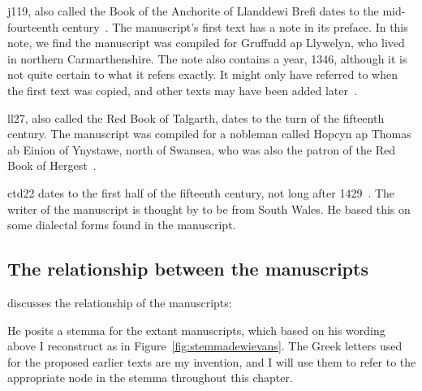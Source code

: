 \Acrlong{j119}, also called the Book of the Anchorite of Llanddewi Brefi dates to the mid-fourteenth century~\autocite{Tho_TEI13}. The manuscript's first text has a note in its preface. In this note, we find the manuscript was compiled for Gruffudd ap Llywelyn, who lived in northern Carmarthenshire. The note also contains a year, 1346, although it is not quite certain to what it refers exactly. It might only have referred to when the first text was copied, and other texts may have been added later~\autocite[lvi--lvii]{Eva_Welsh88}.

\Acrlong{ll27}, also called the Red Book of Talgarth, dates to the turn of the fifteenth century. The manuscript was compiled for a nobleman called Hopcyn ap Thomas ab Einion of Ynystawe, north of Swansea, who was also the patron of the Red Book of Hergest~\autocite[lvii]{Eva_Welsh88}.

\Acrlong{ctd22} dates to the first half of the fifteenth century, not long after 1429~\autocite{Eva_Welsh88}. The writer of the manuscript is thought by \textcite[107]{Pow_description81} to be from South Wales. He based this on some dialectal forms found in the manuscript.

\subsection{The relationship between the manuscripts}
\label{sec:relat-betw-manuscr}
\textcite{Eva_Welsh88} discusses the relationship of the manuscripts:


He posits a stemma for the extant manuscripts, which based on his wording above I reconstruct as in Figure~\ref{fig:stemmadewievans}. The Greek letters used for the proposed earlier texts are my invention, and I will use them to refer to the appropriate node in the stemma throughout this chapter.

